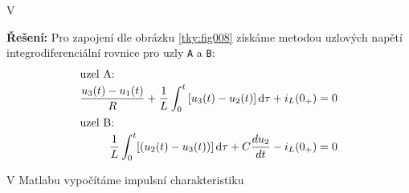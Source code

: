 \begin{mdframed}[style=mdexam]
  \begin{example}\label{tky:exam004}
    V

    {\centering
      \captionsetup{type=figure}
      \label{tky:fig008}
    \par}
    \noindent\textbf{Řešení:} Pro zapojení dle obrázku \ref{tky:fig008} získáme metodou uzlových
    napětí integrodiferenciální rovnice pro uzly \texttt{A} a \texttt{B}:
    \begin{gather*}
      \begin{align*}
        \shortintertext{uzel A:}
        \frac{u_3(t)-u_1(t)}{R}+\frac{1}{L}\int_0^t{[u_3(t)-u_2(t)]}\mathop{}\!\mathrm{d}\tau+i_L(0_+) &= 0  \\
        \shortintertext{uzel B:}
        \frac{1}{L}\int_0^t[(u_2(t)-u_3(t))]\mathop{}\!\mathrm{d}\tau+C\dfrac{d u_2}{d t}-i_L(0_+)           &= 0
      \end{align*}
    \end{gather*}
    
    V Matlabu vypočítáme impulsní charakteristiku 
    
  \end{example} 

  
\end{mdframed}